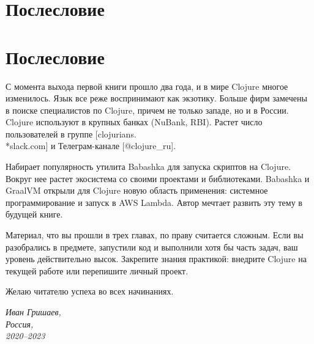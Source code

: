 
\ifprint
\chapter{Послесловие}
\else
\chapter*{Послесловие}
\fi

С момента выхода первой книги прошло два года, и в мире Clojure многое
изменилось. Язык все реже воспринимают как экзотику. Больше фирм замечены в
поиске специалистов по Clojure, причем не только западе, но и в России. Clojure
используют в крупных банках (NuBank, RBI). Растет число пользователей в группе
[clojurians.\\*slack.com]
и Телеграм-канале [@clo\-ju\-re\_ru].

Набирает популярность утилита Babashka для запуска скриптов на Clojure. Вокруг
нее растет экосистема со своими проектами и библиотеками. Babashka и GraalVM
открыли для Clojure новую область применения: системное программирование и
запуск в AWS Lambda. Автор мечтает развить эту тему в будущей книге.

Материал, что вы прошли в трех главах, по праву считается сложным. Если вы
разобрались в предмете, запустили код и выполнили хотя бы часть задач, ваш
уровень действительно высок. Закрепите знания практикой: внедрите Clojure на
текущей работе или перепишите личный проект.

Желаю читателю успеха во всех начинаниях.

\vspace{1em}

\noindent

\hspace{\fill}\parbox{4cm}{\textit{Иван Гришаев,\\Россия,\\2020--2023}}
